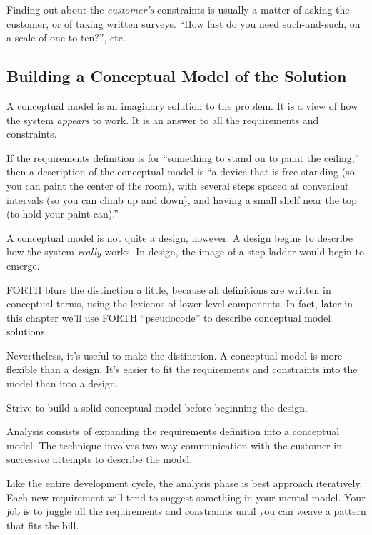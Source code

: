 Finding out about the \emph{customer's} constraints is usually a
matter of asking the customer, or of taking written surveys. ``How
fast do you need such-and-such, on a scale of one to ten?'', etc.

\subsection{Building a Conceptual Model of the Solution}

A conceptual model is an imaginary solution to the problem. It is a
view of how the system \emph{appears} to work. It is an answer to all
the requirements and constraints.


If the requirements definition is for ``something to stand on to paint
the ceiling,'' then a description of the conceptual model is ``a
device that is free-standing (so you can paint the center of the
room), with several steps spaced at convenient intervals (so you can
climb up and down), and having a small shelf near the top (to hold
your paint can).''

A conceptual model is not quite a design, however. A design begins to
describe how the system \emph{really} works. In design, the image of a
step ladder would begin to emerge.

FORTH blurs the distinction a little, because all definitions are
written in conceptual terms, using the lexicons of lower level
components. In fact, later in this chapter we'll use FORTH
``pseudocode'' to describe conceptual model solutions.

Nevertheless, it's useful to make the distinction. A conceptual model
is more flexible than a design. It's easier to fit the requirements
and constraints into the model than into a design.

\begin{tip}
Strive to build a solid conceptual model before beginning the design.
\end{tip}


\noindent Analysis consists of expanding the requirements definition into a
conceptual model. The technique involves two-way communication with the
customer in successive attempts to describe the model.

Like the entire development cycle, the analysis phase is best
approach iteratively. Each new requirement will tend to suggest something
in your mental model. Your job is to juggle all the requirements and
constraints until you can weave a pattern that fits the bill.


